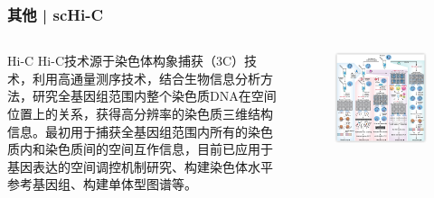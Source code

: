 \documentclass[11pt]{ctexbeamer}
\begin{document}
\begin{frame}
	\frametitle{其他 | scHi-C}
	\begin{columns}
			\begin{block}{Hi-C}
				Hi-C技术源于染色体构象捕获（3C）技术，利用高通量测序技术，结合生物信息分析方法，研究全基因组范围内整个染色质DNA在空间位置上的关系，获得高分辨率的染色质三维结构信息。最初用于捕获全基因组范围内所有的染色质内和染色质间的空间互作信息，目前已应用于基因表达的空间调控机制研究、构建染色体水平参考基因组、构建单体型图谱等。
		\end{block}
				\begin{figure}
		\includegraphics[width=\textwidth]{scHi-C_03.png}
	\end{figure}
	\end{columns}
\end{frame}
\end{document}
